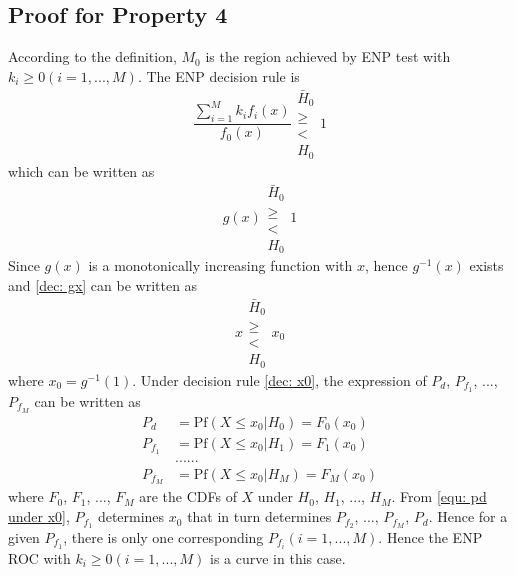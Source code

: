 \documentclass[12pt,journal,a4paper,twoside,onecolumn]{IEEEtran}
\begin{document}
\begin{spacing}{2.5}
\subsection{Proof for Property 4}
According to the definition, $M_0$ is the region achieved by ENP test with $k_i \geq 0 (i=1, ..., M)$. The ENP decision rule is
\begin{equation}
\frac{\sum_{i=1}^{M}k_if_i(x)}{f_0(x)} \substack{\bar{H}_0 \\\geq\\< \\H_0}1
\end{equation}
which can be written as
\begin{equation}
\label{dec: gx}
g(x)\substack{\bar{H}_0 \\\geq\\< \\H_0}1
\end{equation}
Since $g(x)$ is a monotonically increasing function with $x$, hence $g^{-1}(x)$ exists and \eqref{dec: gx} can be written as 
\begin{equation}
\label{dec: x0}
x\substack{\bar{H}_0 \\\geq\\< \\H_0}x_0
\end{equation}
where $x_0 = g^{-1}(1)$.
Under decision rule \eqref{dec: x0}, the expression of $P_d$, $P_{f_1}$, ..., $P_{f_M}$ can be written as 
\begin{equation}
\begin{split}
\label{equ: pd under x0}
P_d &= \text{Pf}(X \leq x_0 | H_0) = F_0(x_0)\\
P_{f_1} &= \text{Pf}(X \leq x_0 | H_1) = F_1(x_0)\\
  &......\\
P_{f_M} &= \text{Pf}(X \leq x_0 | H_M) = F_M(x_0)
\end{split}
\end{equation}
where $F_0$, $F_1$, ..., $F_M$ are the CDFs of $X$ under $H_0$, $H_1$, ..., $H_M$. From \eqref{equ: pd under x0}, $P_{f_1}$ determines $x_0$ that in turn determines $P_{f_2}$, ..., $P_{f_M}$, $P_d$. Hence for a given $P_{f_1}$, there is only one corresponding $P_{f_i} (i= 1, ..., M)$. Hence the ENP ROC with $k_i \geq 0 (i = 1, ..., M)$ is a curve in this case.


\end{spacing}
\end{document}
